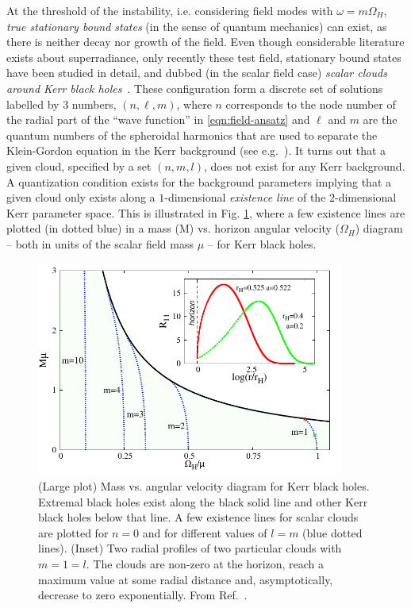 At the threshold of the instability, i.e. considering field modes with $\omega=m\Omega_H$, \textit{true stationary bound states} (in the sense of quantum mechanics) can exist, as there is neither decay nor growth of the field.
Even though considerable literature exists about superradiance, only recently these test field, stationary bound states have been studied in detail, and dubbed (in the scalar field case) \textit{scalar clouds around Kerr black holes}~\cite{Hod:2012px,Hod:2013zza,Herdeiro:2014goa}.
These configuration form a discrete set of solutions labelled by $3$ numbers, $(n,\ell,m)$, where $n$ corresponds to the node number of the radial part of the ``wave function'' in \eqref{eqn:field-ansatz} and $\ell$ and $m$ are the quantum numbers of the spheroidal harmonics that are used to separate the Klein-Gordon equation in the Kerr background (see e.g.~\cite{Brill:1972xj}).
It turns out that a given cloud, specified by a set $(n,m,l)$, does not exist for any Kerr background.
A quantization condition exists for the background parameters implying that a given cloud only exists along a $1$-dimensional \textit{existence line} of the $2$-dimensional Kerr parameter space.
This is illustrated in Fig. \ref{fig:clouds}, where a few existence lines are plotted (in dotted blue) in a mass (M) vs. horizon angular velocity ($\Omega_H$) diagram -- both in units of the scalar field mass $\mu$ -- for Kerr black holes. 
%
\begin{figure}[H]
  \begin{center}
  \includegraphics[height=2.78in]{Figs/unstable-OmegaH-M-clouds.pdf}
  \end{center}
  \caption{(Large plot) Mass vs. angular velocity diagram for Kerr black holes. Extremal black holes exist along the black solid line and other Kerr black holes below that line. A few existence lines for scalar clouds are plotted for $n=0$ and for different values of $l=m$ (blue dotted lines). (Inset) Two radial profiles of two particular clouds with $m=1=l$. The clouds are non-zero at the horizon, reach a maximum value at some radial distance and, asymptotically, decrease to zero exponentially. From Ref.~\cite{Herdeiro:2014goa}.}
  \label{fig:clouds}
\end{figure}

